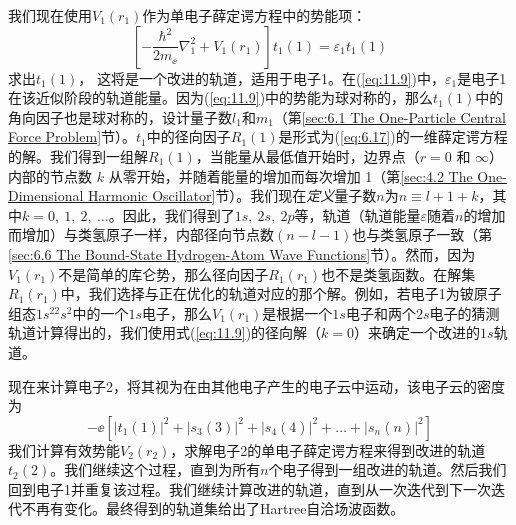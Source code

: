     我们现在使用$V_1\left(r_1\right)$作为单电子薛定谔方程中的势能项：
    \begin{equation}
        \left[-\frac{\hbar^2}{2m_{\ee }}\nabla_1^2 + V_1\left(r_1\right)\right]t_1\left(1\right) = \varepsilon_1t_1\left(1\right)
        \label{eq:11.9}
    \end{equation}
    求出$t_1(1)$， 这将是一个改进的轨道，适用于电子1。在(\ref{eq:11.9})中，$\varepsilon_1$是电子1在该近似阶段的轨道能量。因为(\ref{eq:11.9})中的势能为球对称的，那么$t_1(1)$中的角向因子也是球对称的，设计量子数$l_1$和$m_1$（第\ref{sec:6.1 The One-Particle Central Force Problem}节）。$t_1$中的径向因子$R_1(1)$是形式为(\ref{eq:6.17})的一维薛定谔方程的解。我们得到一组解$R_1(1)$，当能量从最低值开始时，边界点（$r = 0$ 和 $\infty$）内部的节点数 $k$ 从零开始，并随着能量的增加而每次增加 1（第\ref{sec:4.2 The One-Dimensional Harmonic Oscillator}节）。我们现在\textit{定义}量子数$n$为$n \equiv l + 1 + k$，其中$k = 0,\:1,\:2,\:\ldots$。因此，我们得到了$1s, \: 2s, \: 2p$等，轨道（轨道能量$\varepsilon$随着$n$的增加而增加）与类氢原子一样，内部径向节点数$\left(n - l - 1\right)$也与类氢原子一致（第\ref{sec:6.6 The Bound-State Hydrogen-Atom Wave Functions}节）。然而，因为$V_1\left(r_1\right)$不是简单的库仑势，那么径向因子$R_1\left(r_1\right)$也不是类氢函数。在解集$R_1\left(r_1\right)$中，我们选择与正在优化的轨道对应的那个解。例如，若电子1为铍原子组态$1s^22s^2$中的一个$1s$电子，那么$V_1\left(r_1\right)$是根据一个$1s$电子和两个$2s$电子的猜测轨道计算得出的，我们使用式(\ref{eq:11.9})的径向解（$k=0$）来确定一个改进的$1s$轨道。

    现在来计算电子2，将其视为在由其他电子产生的电子云中运动，该电子云的密度为
    \begin{equation*}
        -\ee \left[ \left| t_1 (1) \right|^2 + \left| s_3 (3) \right|^2 + \left| s_4 (4) \right|^2 + \dots + \left| s_n (n) \right|^2 \right]
    \end{equation*}
    我们计算有效势能$V_2\left(r_2\right)$，求解电子2的单电子薛定谔方程来得到改进的轨道$t_2\left(2\right)$。我们继续这个过程，直到为所有$n$个电子得到一组改进的轨道。然后我们回到电子1并重复该过程。我们继续计算改进的轨道，直到从一次迭代到下一次迭代不再有变化。最终得到的轨道集给出了Hartree自洽场波函数。

